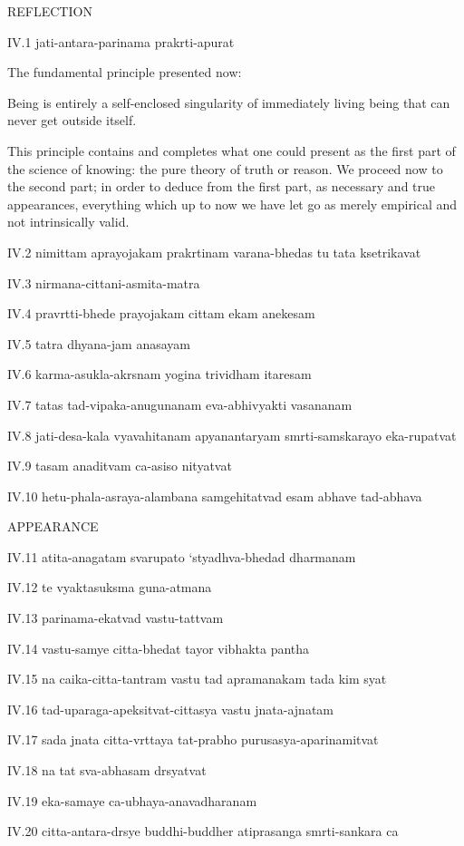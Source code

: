 REFLECTION

IV.1
jati-antara-parinama prakrti-apurat

The fundamental principle presented now:

Being is entirely a self-enclosed singularity of
immediately living being that can never get outside itself.

    This principle contains and completes
    what one could present as the first part
    of the science of knowing:
    the pure theory of truth or reason.
    We proceed now to the second part;
    in order to deduce from the first part,
    as necessary and true appearances,
    everything which up to now we have
    let go as merely empirical
    and not intrinsically valid.

IV.2
nimittam aprayojakam prakrtinam varana-bhedas tu tata ksetrikavat

IV.3
nirmana-cittani-asmita-matra

IV.4
pravrtti-bhede prayojakam cittam ekam anekesam

IV.5
tatra dhyana-jam anasayam

IV.6
karma-asukla-akrsnam yogina trividham itaresam

IV.7
tatas tad-vipaka-anugunanam eva-abhivyakti vasananam

IV.8
jati-desa-kala vyavahitanam apyanantaryam smrti-samskarayo eka-rupatvat

IV.9
tasam anaditvam ca-asiso nityatvat

IV.10
hetu-phala-asraya-alambana samgehitatvad esam abhave tad-abhava

APPEARANCE

IV.11
atita-anagatam svarupato ‘styadhva-bhedad dharmanam

IV.12
te vyaktasuksma guna-atmana

IV.13
parinama-ekatvad vastu-tattvam

IV.14
vastu-samye citta-bhedat tayor vibhakta pantha

IV.15
na caika-citta-tantram vastu tad apramanakam tada kim syat

IV.16
tad-uparaga-apeksitvat-cittasya vastu jnata-ajnatam

IV.17
sada jnata citta-vrttaya tat-prabho purusasya-aparinamitvat

IV.18
na tat sva-abhasam drsyatvat

IV.19
eka-samaye ca-ubhaya-anavadharanam

IV.20
citta-antara-drsye buddhi-buddher atiprasanga smrti-sankara ca

